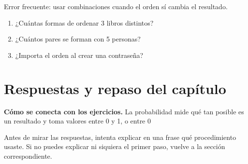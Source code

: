 \documentclass[10pt,oneside,openany]{book}
\begin{document}
\begin{ojo}
Error frecuente: usar combinaciones cuando el orden sí cambia el resultado.
\end{ojo}

\begin{practica}

\begin{enumerate}

\item ¿Cuántas formas de ordenar 3 libros distintos?

\item ¿Cuántos pares se forman con 5 personas?

\item ¿Importa el orden al crear una contraseña?

\end{enumerate}

\end{practica}



\section{Respuestas y repaso del capítulo}

\textbf{Cómo se conecta con los ejercicios.} La probabilidad mide qué tan posible es un resultado y toma valores entre 0 y 1, o entre 0 %

Antes de mirar las respuestas, intenta explicar en una frase qué procedimiento usaste. Si no puedes explicar ni siquiera el primer paso, vuelve a la sección correspondiente.
\end{document}
